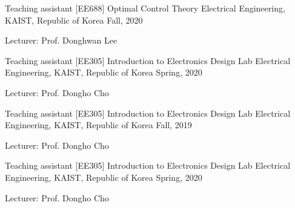 \begin{cventries}
  \cventry
    {Teaching assistant} %
    {[EE688] Optimal Control Theory} %
    {Electrical Engineering, KAIST, Republic of Korea} %
    {Fall, 2020} %
    {
      \begin{cvitems} %
        \item {Lecturer: Prof. Donghwan Lee}
      \end{cvitems}
    }

  \cventry
    {Teaching assistant} %
    {[EE305] Introduction to Electronics Design Lab} %
    {Electrical Engineering, KAIST, Republic of Korea} %
    {Spring, 2020} %
    {
      \begin{cvitems} %
        \item {Lecturer: Prof. Dongho Cho}
      \end{cvitems}
    }

  \cventry
    {Teaching assistant} %
    {[EE305] Introduction to Electronics Design Lab} %
    {Electrical Engineering, KAIST, Republic of Korea} %
    {Fall, 2019} %
    {
      \begin{cvitems} %
        \item {Lecturer: Prof. Dongho Cho}
      \end{cvitems}
    }

  \cventry
    {Teaching assistant} %
    {[EE305] Introduction to Electronics Design Lab} %
    {Electrical Engineering, KAIST, Republic of Korea} %
    {Spring, 2020} %
    {
      \begin{cvitems} %
        \item {Lecturer: Prof. Dongho Cho}
      \end{cvitems}
    }



\end{cventries}
